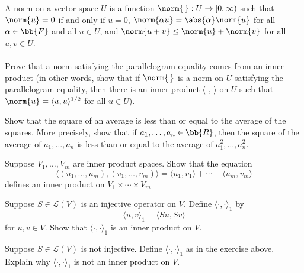 \documentclass[12pt,letterpaper]{hmcpset}
\begin{document}
\begin{problem}[21]
	A norm on a vector space $U$ is a function $\norm{\,}: U \to [0, \infty)$ such that $\norm{u} = 0$ if and only if $u = 0$, $\norm{\alpha u} = \abs{\alpha} \norm{u}$ for all $\alpha \in \bb{F}$ and all $u \in U$, and $\norm{u + v} \le \norm{u} + \norm{v}$ for all $u, v \in U$. \\\\
	Prove that a norm satisfying the parallelogram equality comes from an inner product (in other words, show that if $\norm{\,}$ is a norm on $U$ satisfying the parallelogram equality, then there is an inner product $\langle \,\, , \, \rangle$ on $U$ such that $\norm{u} = \langle u, u \rangle^{1/2}$ for all $u \in U$).
\end{problem}

\pagebreak

\begin{problem}[22]
	Show that the square of an average is less than or equal to the average of the squares. More precisely, show that if $a_1, \ldots, a_n \in \bb{R}$, then the square of the average of $a_1, \ldots, a_n$ is less than or equal to the average of $a_1^2, \ldots, a_n^2$.
\end{problem}

\pagebreak

\begin{problem}[23]
	Suppose $V_1, \ldots, V_m$ are inner product spaces. Show that the equation
	\[
		\langle (u_1, \ldots, u_m), (v_1, \ldots, v_m) \rangle = \langle u_1, v_1 \rangle + \cdots + \langle u_m, v_m \rangle
	\]
	defines an inner product on $V_1 \times \cdots \times V_m$
\end{problem}

\pagebreak

\begin{problem}[24]
	Suppose $S \in \mathcal{L}(V)$ is an injective operator on $V$. Define $\langle \cdot, \cdot \rangle_1$ by
	\[
		\langle u, v \rangle_1 = \langle Su, Sv \rangle
	\]
	for $u, v \in V$. Show that $\langle \cdot, \cdot \rangle_1$ is an inner product on $V$.
\end{problem}

\pagebreak

\begin{problem}[25]
	Suppose $S \in \mathcal{L}(V)$ is not injective. Define $\langle \cdot, \cdot \rangle_1$ as in the exercise above. Explain why $\langle \cdot, \cdot \rangle_1$ is not an inner product on $V$.
\end{problem}
\end{document}

